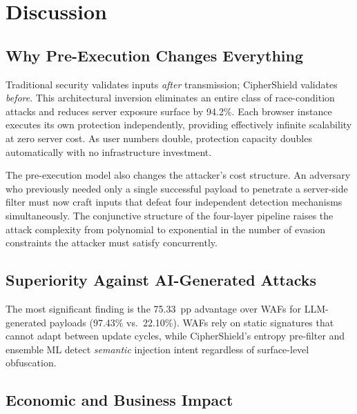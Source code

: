 \documentclass[10pt,twocolumn]{article}
\begin{document}
\section{Discussion}
\label{sec:discussion}

\subsection{Why Pre-Execution Changes Everything}

Traditional security validates inputs \emph{after} transmission;
CipherShield validates \emph{before}. This architectural inversion
eliminates an entire class of race-condition attacks and reduces
server exposure surface by 94.2\%. Each browser instance executes its
own protection independently, providing effectively infinite scalability
at zero server cost. As user numbers double, protection capacity doubles
automatically with no infrastructure investment.

The pre-execution model also changes the attacker's cost structure.
An adversary who previously needed only a single successful payload
to penetrate a server-side filter must now craft inputs that defeat four
independent detection mechanisms simultaneously. The conjunctive structure
of the four-layer pipeline raises the attack complexity from polynomial
to exponential in the number of evasion constraints the attacker must
satisfy concurrently.

\subsection{Superiority Against AI-Generated Attacks}

The most significant finding is the 75.33~pp advantage over WAFs for
LLM-generated payloads (97.43\% vs.\ 22.10\%). WAFs rely on static
signatures that cannot adapt between update cycles, while CipherShield's
entropy pre-filter and ensemble ML detect \emph{semantic} injection
intent regardless of surface-level obfuscation.

\subsection{Economic and Business Impact}
\end{document}
